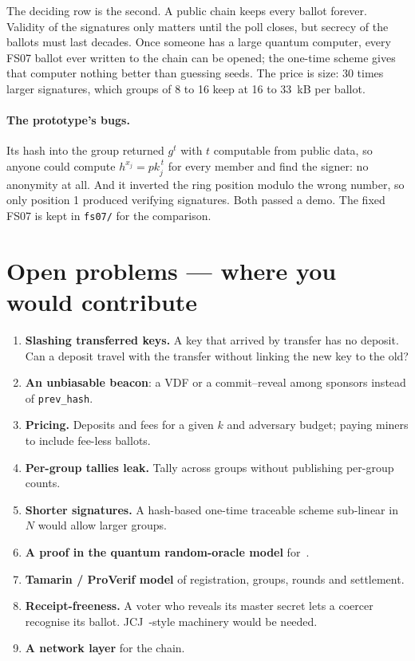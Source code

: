 \documentclass[11pt,a4paper]{article}
\newcommand{\pk}{\mathit{pk}}
\newcommand{\file}[1]{\texttt{#1}}
\theoremstyle{definition}
\begin{document}
\noindent
The deciding row is the second. A public chain keeps every ballot forever.
Validity of the signatures only matters until the poll closes, but secrecy
of the ballots must last decades. Once someone has a large quantum
computer, every FS07 ballot ever written to the chain can be opened; the
one-time scheme gives that computer nothing better than guessing seeds.
The price is size: 30 times larger signatures, which groups of 8 to 16
keep at 16 to 33~kB per ballot.

\paragraph{The prototype's bugs.} Its hash into the group returned
$g^{t}$ with $t$ computable from public data, so anyone could compute $h^{x_j}
= \pk_j^{\,t}$ for every member and find the signer: no anonymity at all.
And it inverted the ring position modulo the wrong number, so only position
1 produced verifying signatures. Both passed a demo. The fixed FS07 is kept
in \file{fs07/} for the comparison.

\section{Open problems --- where you would contribute}
\label{sec:open}

\begin{enumerate}[leftmargin=*]
  \item\label{itm:slash} \textbf{Slashing transferred keys.} A key that
    arrived by transfer has no deposit. Can a deposit travel with the
    transfer without linking the new key to the old?
  \item\label{itm:beacon} \textbf{An unbiasable beacon}: a VDF or a
    commit--reveal among sponsors instead of \texttt{prev\_hash}.
  \item\label{itm:pricing} \textbf{Pricing.} Deposits and fees for a given
    $k$ and adversary budget; paying miners to include fee-less ballots.
  \item\label{itm:leak} \textbf{Per-group tallies leak.} Tally across
    groups without publishing per-group counts.
  \item\label{itm:short} \textbf{Shorter signatures.} A hash-based
    one-time traceable scheme sub-linear in $N$ would allow larger groups.
  \item\label{itm:qrom} \textbf{A proof in the quantum random-oracle
    model} for~\cite{SZ21}.
  \item\label{itm:formal} \textbf{Tamarin / ProVerif model} of
    registration, groups, rounds and settlement.
  \item\label{itm:receipt} \textbf{Receipt-freeness.} A voter who reveals
    its master secret lets a coercer recognise its ballot.
    JCJ~\cite{JCJ2005}-style machinery would be needed.
  \item\label{itm:net} \textbf{A network layer} for the chain.
\end{enumerate}
\end{document}
